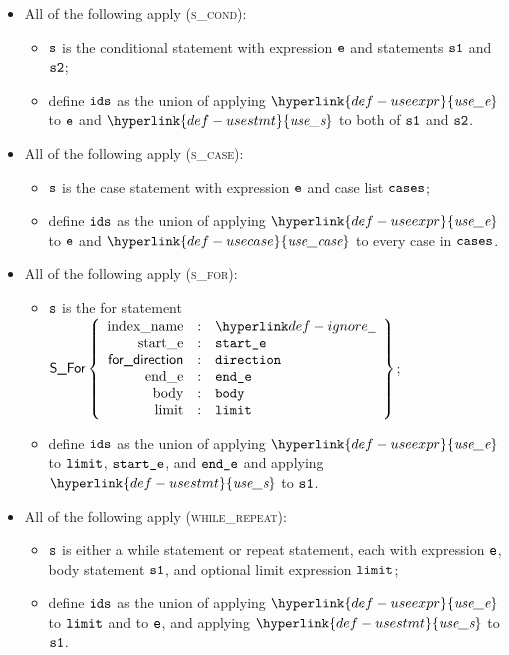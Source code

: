 \documentclass{book}
\newcommand\useexpr[0]{\hyperlink{def-useexpr}{\textfunc{use\_e}}}
\newcommand\usestmt[0]{\hyperlink{def-usestmt}{\textfunc{use\_s}}}
\newcommand\usecase[0]{\hyperlink{def-usecase}{\textfunc{use\_case}}}
\begin{document}
\begin{itemize}
  \item All of the following apply (\textsc{s\_cond}):
  \begin{itemize}
    \item $\texttt{s}$ is the conditional statement with expression $\texttt{e}$ and statements $\texttt{s1}$ and $\texttt{s2}$;
    \item define $\texttt{ids}$ as the union of applying $\useexpr$ to $\texttt{e}$ and $\usestmt$ to both of $\texttt{s1}$ and $\texttt{s2}$.
  \end{itemize}

  \item All of the following apply (\textsc{s\_case}):
  \begin{itemize}
    \item $\texttt{s}$ is the case statement with expression $\texttt{e}$ and case list $\texttt{cases}$;
    \item define $\texttt{ids}$ as the union of applying $\useexpr$ to $\texttt{e}$ and $\usecase$ to every case in $\texttt{cases}$.
  \end{itemize}

  \item All of the following apply (\textsc{s\_for}):
  \begin{itemize}
    \item $\texttt{s}$ is the for statement $\SFor\left\{\begin{array}{rcl}
      \Forindexname &:& \Ignore\\
      \Forstarte &:& \vstarte\\
      \fordirection &:& \vdirection\\
      \Forende &:& \vende\\
      \Forbody &:& \vbody\\
      \Forlimit &:& \vlimit
    \end{array}\right\}$;
    \item define $\texttt{ids}$ as the union of applying $\useexpr$ to $\texttt{limit}$, $\texttt{start\_e}$, and $\texttt{end\_e}$ and applying $\usestmt$ to $\texttt{s1}$.
  \end{itemize}

  \item All of the following apply (\textsc{while\_repeat}):
  \begin{itemize}
    \item $\texttt{s}$ is either a while statement or repeat statement, each with expression $\texttt{e}$, body statement $\texttt{s1}$,
          and optional limit expression $\texttt{limit}$;
    \item define $\texttt{ids}$ as the union of applying $\useexpr$ to $\texttt{limit}$ and to $\texttt{e}$, and applying $\usestmt$ to $\texttt{s1}$.
  \end{itemize}


\end{itemize}
\end{document}
